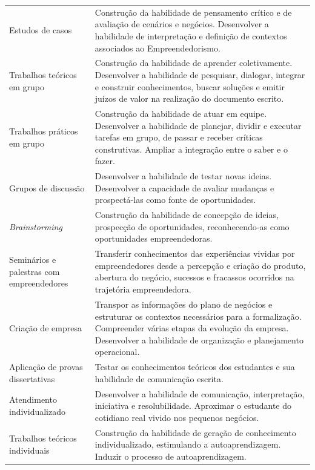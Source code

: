 \begin{center}
\begin{longtable}{p{3.5cm}p{11.0cm}}
Estudos de casos & Construção da habilidade de pensamento crítico e de avaliação de cenários e
negócios. Desenvolver a habilidade de interpretação e definição de contextos associados ao Empreendedorismo. \\ 

Trabalhos teóricos em grupo & Construção da habilidade de aprender coletivamente. Desenvolver a
habilidade de pesquisar, dialogar, integrar e construir conhecimentos,
buscar soluções e emitir juízos de valor na realização do documento escrito. \\ 

Trabalhos práticos em grupo & Construção da habilidade de atuar em equipe. Desenvolver a habilidade de planejar, dividir e executar tarefas em grupo, de passar e receber críticas construtivas. Ampliar a integração entre o saber e o fazer.  \\ 

Grupos de discussão & Desenvolver a habilidade de testar novas ideias. Desenvolver a capacidade de avaliar mudanças e prospectá-las como fonte de oportunidades. \\ 
 
\textit{Brainstorming}  & Construção da habilidade de concepção de ideias, prospecção de
oportunidades, reconhecendo-as como oportunidades empreendedoras. \\ 


Seminários e palestras com empreendedores & Transferir conhecimentos das experiências vividas por empreendedores
desde a percepção e criação do produto, abertura do negócio, sucessos e
fracassos ocorridos na trajetória empreendedora. \\ 

Criação de empresa & Transpor as informações do plano de negócios e estruturar os contextos necessários para a formalização. Compreender várias etapas da evolução da empresa. Desenvolver a habilidade de organização e planejamento operacional. \\ 

Aplicação de provas dissertativas & Testar os conhecimentos teóricos dos estudantes e sua habilidade de
comunicação escrita. \\ 

Atendimento individualizado & Desenvolver a habilidade de comunicação, interpretação, iniciativa e
resolubilidade. Aproximar o estudante do cotidiano real vivido nos pequenos negócios. \\ 

Trabalhos teóricos individuais & Construção da habilidade de geração de conhecimento individualizado,
estimulando a autoaprendizagem. Induzir o processo de autoaprendizagem. \\ 


\end{longtable}
\end{center}
